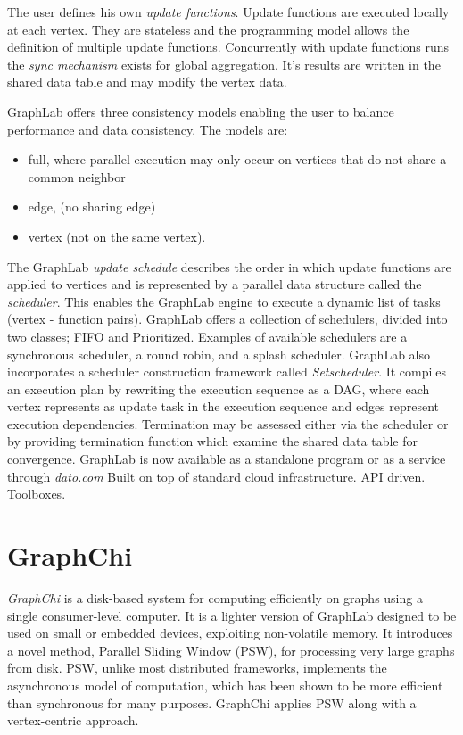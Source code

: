 \documentclass[letterpaper,twocolumn,10pt]{article}
\begin{document}
The user defines his own \textit{update functions}. Update functions are executed locally at each vertex. They are stateless and the programming model allows the definition of multiple update functions. Concurrently with update functions runs the \textit{sync mechanism} exists for global aggregation. It's results are written in the shared data table and may modify the vertex data.

GraphLab offers three consistency models enabling the user to balance performance and data consistency. The models are:
\begin{itemize}
\item full, where parallel execution may only occur on vertices that do not share a common neighbor
\item edge, (no sharing edge) 
\item vertex (not on the same vertex).
\end{itemize}

The GraphLab \textit{update schedule} describes the order in which update functions are applied to vertices and is represented by a parallel data structure called the \textit{scheduler}. This enables the GraphLab engine to execute a dynamic list of tasks (vertex - function pairs).
GraphLab offers a collection of schedulers, divided into two classes; FIFO and Prioritized. Examples of available schedulers are a synchronous scheduler, a round robin, and a splash scheduler. GraphLab also incorporates a scheduler construction framework called \textit{Setscheduler}. It compiles an execution plan by rewriting the execution sequence as a DAG, where each vertex represents as update task in the execution sequence and edges represent execution dependencies.
Termination may be assessed either via the scheduler or by providing termination function which examine the shared data table for convergence.
GraphLab is now available as a standalone program or as a service through \textit{dato.com}
Built on top of standard cloud infrastructure. 
API driven. Toolboxes.

\section{GraphChi}
\textit{GraphChi} is a disk-based system for computing efficiently on graphs using a single consumer-level computer. It is a lighter version of GraphLab designed to be used on small or embedded devices, exploiting non-volatile memory. It introduces a novel method, Parallel Sliding Window (PSW), for processing very large graphs from disk. PSW, unlike most distributed frameworks, implements the asynchronous model of computation, which has been shown to be more efficient than synchronous for many purposes.
GraphChi applies PSW along with a vertex-centric approach.
\end{document}
